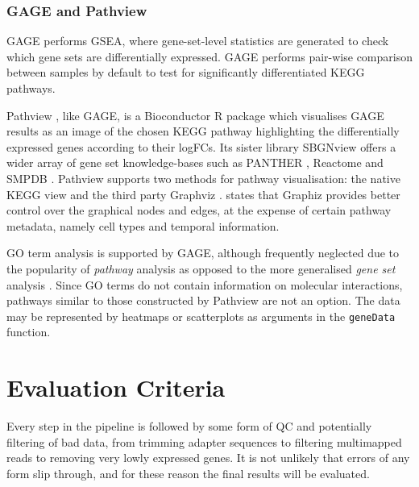 \subsubsection{GAGE and Pathview}
GAGE \citep{luo2009gage} performs \ac{GSEA}, where gene-set-level statistics are generated to check which gene sets are differentially expressed. %
GAGE performs pair-wise comparison between samples by default to test for significantly differentiated KEGG pathways. 

Pathview \citep{luo2013pathview}, like GAGE, is a Bioconductor \citep{gentleman2004bioconductor} R package which visualises GAGE results as an image of the chosen KEGG pathway highlighting the differentially expressed genes according to their \ac{logFC}s. Its sister library SBGNview \citep{dong2022sbgnview} offers a wider array of gene set knowledge-bases such as PANTHER \citep{mi2005panther}, Reactome \citep{croft2010reactome} and SMPDB \citep{frolkis2010smpdb}. Pathview supports two methods for pathway visualisation: the native KEGG view and the third party Graphviz \citep{ellson2001graphviz}. \cite{luo2013pathview} states that Graphiz provides better control over the graphical nodes and edges, at the expense of certain pathway metadata, namely cell types and temporal information.

\ac{GO} term analysis is supported by GAGE, although frequently neglected due to the popularity of \textit{pathway} analysis as opposed to the more generalised \textit{gene set} analysis \citep{luo2009gage}. Since \ac{GO} terms do not contain information on molecular interactions, pathways similar to those constructed by Pathview are not an option. The data may be represented by heatmaps or scatterplots as arguments in the \texttt{geneData} function.



\clearpage
\section{Evaluation Criteria}
Every step in the pipeline is followed by some form of QC and potentially filtering of bad data, from trimming adapter sequences to filtering multimapped reads to removing very lowly expressed genes. It is not unlikely that errors of any form slip through, and for these reason the final results will be evaluated.

